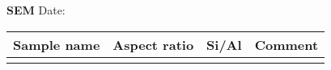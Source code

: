 \documentclass[10pt,a4paper]{article}
\newcommand{\subsecwithdate}[1]{{\color{bl}\scshape\bfseries\large {#1} }\hfill %
{\color{bl} Date: \Ovalbox{ \begin{minipage}{1.2in} \hfill\vspace{10pt} \end{minipage} }} \par}
\begin{document}
\subsecwithdate{SEM}
\begin{center}
    \begin{tabularx}{\textwidth}{C|C|C|C}
    \toprule
    Sample name & Aspect ratio & Si/Al & Comment \\
    \midrule
            &              &       &   \\
    \bottomrule
    \end{tabularx}
\end{center}
\end{document}
